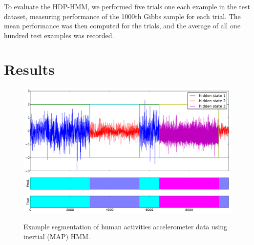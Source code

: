 \documentclass[letterpaper]{article}
\begin{document}
To evaluate the HDP-HMM, we performed five trials one each example in the test dataset, measuring performance of the 1000th Gibbs sample for each trial. The mean performance was then computed for the trials, and the average of all one hundred test examples was recorded.

\section{Results}\label{sec:Results}

\begin{figure}[htbp]
    \caption{Example segmentation of human activities accelerometer data using inertial (MAP) HMM.}
  \centering
    \includegraphics[width=0.8\linewidth]{images/MAP_PARAM_FREE_results_hard_activity_long_1,97_3_states.pdf}
    \label{fig:real-results-MAP}
\end{figure}
\end{document}
